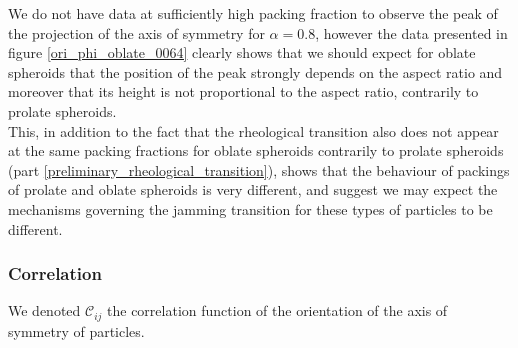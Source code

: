 \documentclass[class=report, float=false, crop=false]{standalone}
\begin{document}
We do not have data at sufficiently high packing fraction to observe the peak of the projection of the axis of symmetry for $\alpha=0.8$, however the data presented in figure \ref{ori_phi_oblate_0064} clearly shows that we should expect for oblate spheroids that the position of the peak strongly depends on the aspect ratio and moreover that its height is not proportional to the aspect ratio, contrarily to prolate spheroids.\\

This, in addition to the fact that the rheological transition also does not appear at the same packing fractions for oblate spheroids contrarily to prolate spheroids (part \ref{preliminary_rheological_transition}), shows that the behaviour of packings of prolate and oblate spheroids is very different, and suggest we may expect the mechanisms governing the jamming transition for these types of particles to be different.

\subsubsection{Correlation}

We denoted $\mathcal{C}_{ij}$ the correlation function of the orientation of the axis of symmetry of particles.

\end{document}
